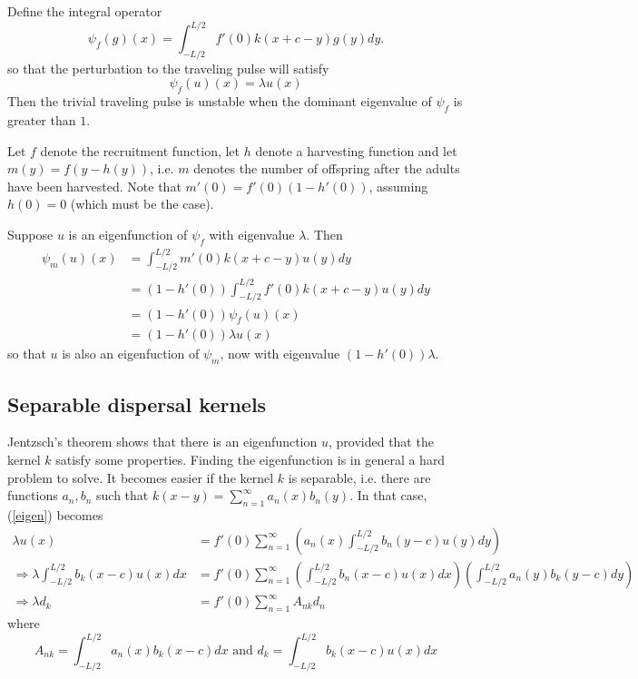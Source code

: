 \documentclass[12pt,english]{article}
\begin{document}
\begin{spacing}{1.9}
\begin{flushleft}
Define the integral operator
$$ \psi_f(g)(x)=\int_{-L/2}^{L/2}f'(0)k(x+c-y)g(y)dy. $$
so that the perturbation to the traveling pulse will satisfy 
\begin{equation} \psi_f(u)(x)=\lambda u(x) \label{eigen} \end{equation}
Then the trivial traveling pulse is unstable when the dominant eigenvalue of $\psi_f$ is greater than $1$.

Let $f$ denote the recruitment function, let $h$ denote a harvesting function and let $m(y)=f(y-h(y))$, i.e. $m$ denotes the number of offspring after the adults have been harvested.  Note that $m'(0)=f'(0)(1-h'(0))$, assuming $h(0)=0$ (which must be the case).

Suppose $u$ is an eigenfunction of $\psi_f$ with eigenvalue $\lambda$.  Then 
\begin{align*}
\psi_m(u)(x)&=\int_{-L/2}^{L/2}m'(0)k(x+c-y)u(y)dy
\\&=(1-h'(0))\int_{-L/2}^{L/2}f'(0)k(x+c-y)u(y)dy
\\&=(1-h'(0))\psi_f(u)(x)
\\&=(1-h'(0))\lambda u(x)
\end{align*}
so that $u$ is also an eigenfuction of $\psi_m$, now with eigenvalue $(1-h'(0))\lambda$.

\subsection{Separable dispersal kernels }
Jentzsch's theorem shows that there is an eigenfunction $u$, provided that the kernel $k$ satisfy some properties.  Finding the eigenfunction is in general a hard problem to solve.  It becomes easier if the kernel $k$ is separable, i.e. there are functions $a_n,b_n$ such that $k(x-y)=\sum_{n=1}^\infty a_n(x)b_n(y)$.  In that case, (\ref{eigen}) becomes
\begin{align*}
\lambda u(x)&=f'(0)\sum_{n=1}^\infty\left( a_n(x)\int_{-L/2}^{L/2}b_n(y-c)u(y)dy\right)
\\ \Rightarrow \lambda\int_{-L/2}^{L/2}b_k(x-c)u(x)dx&=f'(0)\sum_{n=1}^{\infty}\left(\int_{-L/2}^{L/2}b_n(x-c)u(x)dx\right)\left(\int_{-L/2}^{L/2}a_n(y)b_k(y-c)dy\right)
\\ \Rightarrow \lambda d_k&=f'(0)\sum_{n=1}^\infty A_{nk}d_n  \tag{**} \label{problem}
\end{align*}
where
\begin{equation*}
A_{nk}=\int_{-L/2}^{L/2}a_n(x)b_k(x-c)dx \text{ and } d_k=\int_{-L/2}^{L/2}b_k(x-c)u(x)dx
\end{equation*}


\end{flushleft}
\end{spacing}
\end{document}
